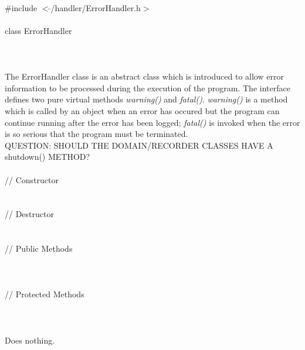 
   \\
\indent \#include $<\tilde{ }$/handler/ErrorHandler.h$>$  \\

  \\
\indent class ErrorHandler \\

 \\
 \\

  \\
\indent The ErrorHandler class is an abstract class which is
introduced to allow error information to be processed during the
execution of the program. The interface defines two pure virtual
methods {\em warning()} and {\em fatal()}. {\em warning()} is a method
which is called by an object when an error has occured but the program
can continue running after the error has been logged; {\em fatal()} is
invoked when the error is so serious that the program must be
terminated. \\ 

QUESTION: SHOULD THE DOMAIN/RECORDER CLASSES HAVE A shutdown() METHOD? \\

 \\
\indent // Constructor \\
\\ \\
\indent // Destructor \\
\\ \\
\indent // Public Methods  \\
\\
\\ \\
\indent // Protected Methods  \\
 \\

  \\
  \\ 
Does nothing.\\


